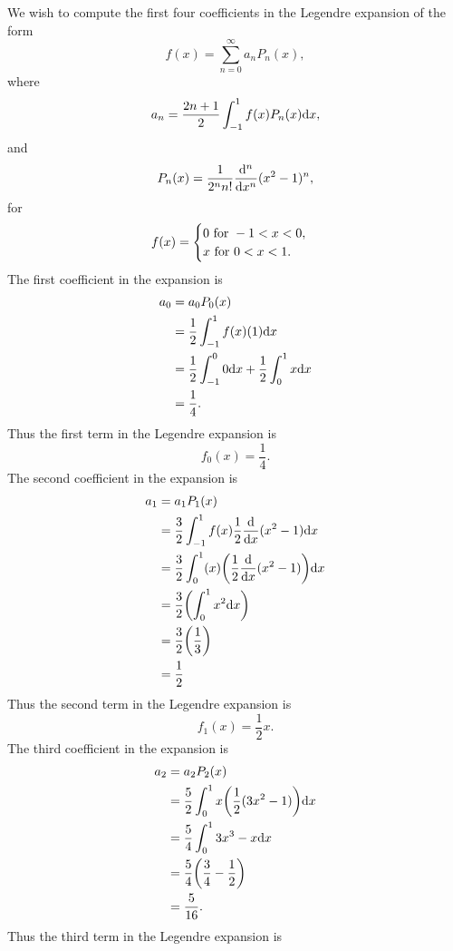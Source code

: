 \documentclass[12pt]{report}
\begin{document}
\begin{solution}

    \noindent
    We wish to compute the first four coefficients in the Legendre expansion of the form
    \[
        f(x) = \sum_{n=0}^{\infty} a_n P_n(x),
    \]
    where
    \[
        a_n = \frac{2n+1}{2}\int_{-1}^{1}f(x) P_n(x) {\mathrm{d}} x,
    \]
    and
    \[
        P_n(x) = \frac{1}{2^n n!}\frac{\mathrm{d}^{n} }{\mathrm{d} x^{n}}(x^2 - 1)^n,    
    \]
    for 
    \[
        f(x) = \begin{cases}
            0 {~\text{for}~} -1<x<0,\\
            x ~\text{for}~ 0<x<1.
        \end{cases}
    \]
    The first coefficient in the expansion is
    \begin{align*}
        a_0 &= a_0P_0(x)\\
        &= \frac{1}{2}\int_{-1}^{1}f(x) (1) {\mathrm{d}} x\\
        &= \frac{1}{2}\int_{-1}^{0}0 {\mathrm{d}} x + \frac{1}{2}\int_{0}^{1}x {\mathrm{d}} x\\
        &= \frac{1}{4}.
    \end{align*}
    Thus the first term in the Legendre expansion is
    \[
        f_0(x) = \frac{1}{4}.
    \]
    The second coefficient in the expansion is
    \begin{align*}
        a_1 &= a_1P_1(x)\\
        &= \frac{3}{2}\int_{-1}^{1}f(x) \frac{1}{2}\frac{\mathrm{d} }{\mathrm{d} x}(x^2 - 1) {\mathrm{d}} x  \\
        &= \frac{3}{2}\int_{0}^{1}(x){\left(\frac{1}{2}\frac{\mathrm{d} }{\mathrm{d} x}(x^2 - 1)\right)} {\mathrm{d}} x\\
        &= \frac{3}{2}{\left(\int_{0}^{1}x^2 {\mathrm{d}} x\right)}\\
        &= \frac{3}{2} {\left(\frac{1}{3}\right)}\\
        &= \frac{1}{2}
    \end{align*}
    Thus the second term in the Legendre expansion is
    \[
        f_1(x) = \frac{1}{2} x.
    \]
    The third coefficient in the expansion is
    \begin{align*}
        a_2 &= a_2P_2(x)\\
        &= \frac{5}{2}\int_{0}^{1}x {\left(\frac{1}{2}(3x^2 - 1)\right)} {\mathrm{d}} x\\
        &= \frac{5}{4}\int_0^1 3x^3 - x {\mathrm{d}} x\\
        &= \frac{5}{4}{\left(\frac{3}{4} - \frac{1}{2}\right)}\\
        &= \frac{5}{16}.
    \end{align*}
    Thus the third term in the Legendre expansion is

\end{solution}
\end{document}
